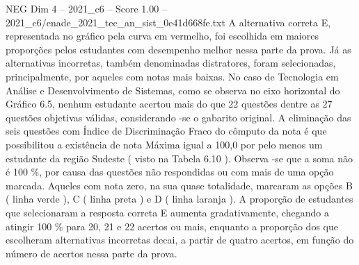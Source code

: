 \begin{textsample}{NEG Dim 4 – 2021\_c6 – Score 1.00 – 2021\_c6/enade\_2021\_tec\_an\_sist\_0e41d668fe.txt}
A alternativa correta E, representada no gráfico pela curva em vermelho, foi escolhida em maiores proporções pelos estudantes com desempenho melhor nessa parte da prova.
Já as alternativas incorretas, também denominadas distratores, foram selecionadas, principalmente, por aqueles com notas mais baixas.
No caso de Tecnologia em Análise e Desenvolvimento de Sistemas, como se observa no eixo horizontal do Gráfico 6.5, nenhum estudante acertou mais do que 22 questões dentre as 27 questões objetivas válidas, considerando -se o gabarito original.
A eliminação das seis questões com Índice de Discriminação Fraco do cômputo da nota é que possibilitou a existência de nota Máxima igual a 100,0 por pelo menos um estudante da região Sudeste ( visto na Tabela 6.10 ).
Observa -se que a soma não é 100 \%, por causa das questões não respondidas ou com mais de uma opção marcada.
Aqueles com nota zero, na sua quase totalidade, marcaram as opções B ( linha verde ), C ( linha preta ) e D ( linha laranja ).
A proporção de estudantes que selecionaram a resposta correta E aumenta gradativamente, chegando a atingir 100 \% para 20, 21 e 22 acertos ou mais, enquanto a proporção dos que escolheram alternativas incorretas decai, a partir de quatro acertos, em função do número de acertos nessa parte da prova.

\end{textsample}
